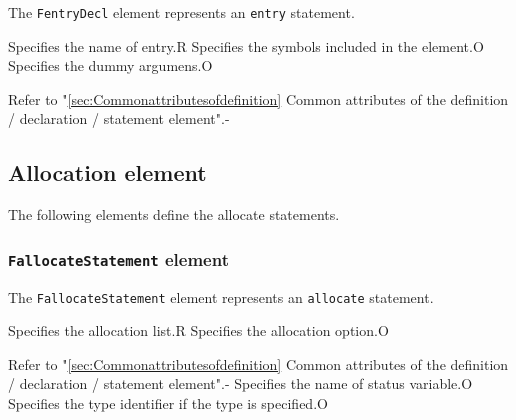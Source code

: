 The {\tt FentryDecl} element represents an {\tt entry} statement.


\begin{XcodeMLChildElements}
{Specifies the name of entry.}{R}
{Specifies the symbols included in the element.}{O}
{Specifies the dummy argumens.}{O}
\end{XcodeMLChildElements}

\begin{XcodeMLAttributes}
{Refer to "\ref{sec:Commonattributesofdefinition} Common attributes of the definition / declaration / statement element".}{-}
\end{XcodeMLAttributes}


\subsection{Allocation element}

The following elements define the allocate statements.

\subsubsection{ {\tt FallocateStatement} element}

The {\tt FallocateStatement} element represents an {\tt allocate} statement.


\begin{XcodeMLChildElements}
{Specifies the allocation list.}{R}
{Specifies the allocation option.}{O}
\end{XcodeMLChildElements}

\begin{XcodeMLAttributes}
{Refer to "\ref{sec:Commonattributesofdefinition} Common attributes of the definition / declaration / statement element".}{-}
{Specifies the name of status variable.}{O}
{Specifies the type identifier if the type is specified.}{O}
\end{XcodeMLAttributes}

